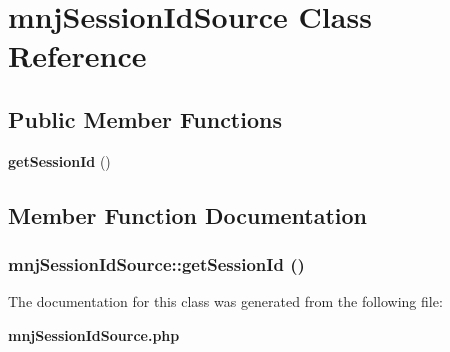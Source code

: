 \section{mnjSessionIdSource Class Reference}
\label{classmnjSessionIdSource}
\subsection*{Public Member Functions}
\begin{CompactItemize}
\item 
{\bf getSessionId} ()
\end{CompactItemize}


\subsection{Member Function Documentation}
\subsubsection{\setlength{\rightskip}{0pt plus 5cm}mnjSessionIdSource::getSessionId ()}\label{classmnjSessionIdSource_8b277f7051afcf7f51903865339d6cd3}




The documentation for this class was generated from the following file:\begin{CompactItemize}
\item 
{\bf mnjSessionIdSource.php}\end{CompactItemize}
